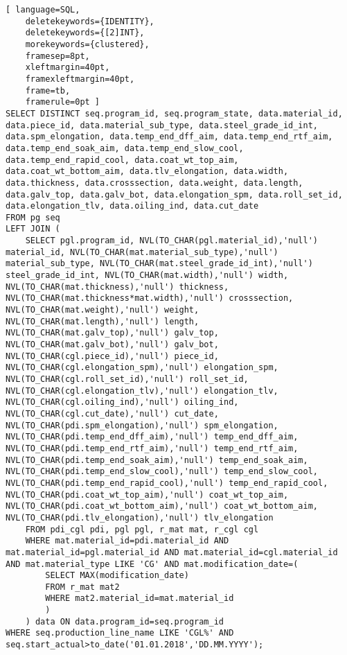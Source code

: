 \documentclass{article}
\begin{document}
	
\thispagestyle{empty}
\begin{lstlisting}[ language=SQL,
	deletekeywords={IDENTITY},
	deletekeywords={[2]INT},
	morekeywords={clustered},
	framesep=8pt,
	xleftmargin=40pt,
	framexleftmargin=40pt,
	frame=tb,
	framerule=0pt ]
SELECT DISTINCT seq.program_id, seq.program_state, data.material_id, data.piece_id, data.material_sub_type, data.steel_grade_id_int, data.spm_elongation, data.temp_end_dff_aim, data.temp_end_rtf_aim, data.temp_end_soak_aim, data.temp_end_slow_cool, data.temp_end_rapid_cool, data.coat_wt_top_aim, data.coat_wt_bottom_aim, data.tlv_elongation, data.width, data.thickness, data.crosssection, data.weight, data.length, data.galv_top, data.galv_bot, data.elongation_spm, data.roll_set_id, data.elongation_tlv, data.oiling_ind, data.cut_date
FROM pg seq 
LEFT JOIN (
	SELECT pgl.program_id, NVL(TO_CHAR(pgl.material_id),'null') material_id, NVL(TO_CHAR(mat.material_sub_type),'null') material_sub_type, NVL(TO_CHAR(mat.steel_grade_id_int),'null') steel_grade_id_int, NVL(TO_CHAR(mat.width),'null') width, NVL(TO_CHAR(mat.thickness),'null') thickness, NVL(TO_CHAR(mat.thickness*mat.width),'null') crosssection, NVL(TO_CHAR(mat.weight),'null') weight, NVL(TO_CHAR(mat.length),'null') length, NVL(TO_CHAR(mat.galv_top),'null') galv_top, NVL(TO_CHAR(mat.galv_bot),'null') galv_bot, NVL(TO_CHAR(cgl.piece_id),'null') piece_id, NVL(TO_CHAR(cgl.elongation_spm),'null') elongation_spm, NVL(TO_CHAR(cgl.roll_set_id),'null') roll_set_id, NVL(TO_CHAR(cgl.elongation_tlv),'null') elongation_tlv, NVL(TO_CHAR(cgl.oiling_ind),'null') oiling_ind, NVL(TO_CHAR(cgl.cut_date),'null') cut_date, NVL(TO_CHAR(pdi.spm_elongation),'null') spm_elongation, NVL(TO_CHAR(pdi.temp_end_dff_aim),'null') temp_end_dff_aim, NVL(TO_CHAR(pdi.temp_end_rtf_aim),'null') temp_end_rtf_aim, NVL(TO_CHAR(pdi.temp_end_soak_aim),'null') temp_end_soak_aim, NVL(TO_CHAR(pdi.temp_end_slow_cool),'null') temp_end_slow_cool, NVL(TO_CHAR(pdi.temp_end_rapid_cool),'null') temp_end_rapid_cool, NVL(TO_CHAR(pdi.coat_wt_top_aim),'null') coat_wt_top_aim, NVL(TO_CHAR(pdi.coat_wt_bottom_aim),'null') coat_wt_bottom_aim, NVL(TO_CHAR(pdi.tlv_elongation),'null') tlv_elongation 
	FROM pdi_cgl pdi, pgl pgl, r_mat mat, r_cgl cgl 
	WHERE mat.material_id=pdi.material_id AND mat.material_id=pgl.material_id AND mat.material_id=cgl.material_id AND mat.material_type LIKE 'CG' AND mat.modification_date=(
		SELECT MAX(modification_date) 
		FROM r_mat mat2 
		WHERE mat2.material_id=mat.material_id
		)
	) data ON data.program_id=seq.program_id 
WHERE seq.production_line_name LIKE 'CGL%' AND seq.start_actual>to_date('01.01.2018','DD.MM.YYYY');
\end{lstlisting}
	
\end{document}
